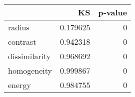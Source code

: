 \begin{tabular}{lrr}
\toprule
{} &        KS &  p-value \\
\midrule
radius        &  0.179625 &        0 \\
contrast      &  0.942318 &        0 \\
dissimilarity &  0.968692 &        0 \\
homogeneity   &  0.999867 &        0 \\
energy        &  0.984755 &        0 \\
\bottomrule
\end{tabular}
